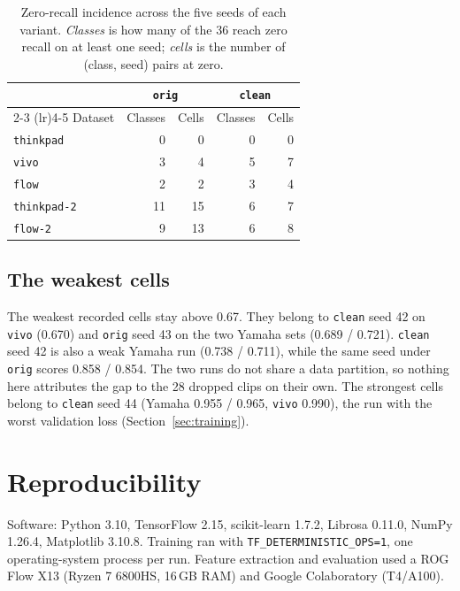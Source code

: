 \documentclass[pdflatex,sn-mathphys-num]{sn-jnl}
\begin{document}
\begin{table}[t]
\caption{Zero-recall incidence across the five seeds of each variant. \emph{Classes} is how many of the 36 reach zero recall on at least one seed; \emph{cells} is the number of (class, seed) pairs at zero.}\label{tab:esm-zero}
\setlength{\tabcolsep}{5pt}
\begin{tabular}{@{}lrrrr@{}}
\toprule
 & \multicolumn{2}{c}{\texttt{orig}} & \multicolumn{2}{c}{\texttt{clean}} \\
\cmidrule(lr){2-3} \cmidrule(lr){4-5}
Dataset & Classes & Cells & Classes & Cells \\
\midrule
\texttt{thinkpad} & 0 & 0 & 0 & 0 \\
\texttt{vivo} & 3 & 4 & 5 & 7 \\
\texttt{flow} & 2 & 2 & 3 & 4 \\
\texttt{thinkpad-2} & 11 & 15 & 6 & 7 \\
\texttt{flow-2} & 9 & 13 & 6 & 8 \\
\bottomrule
\end{tabular}
\end{table}

\subsection{The weakest cells}\label{sec:weakest}

The weakest recorded cells stay above 0.67. They belong to \texttt{clean} seed 42 on \texttt{vivo} (0.670) and \texttt{orig} seed 43 on the two Yamaha sets (0.689 / 0.721). \texttt{clean} seed 42 is also a weak Yamaha run (0.738 / 0.711), while the same seed under \texttt{orig} scores 0.858 / 0.854. The two runs do not share a data partition, so nothing here attributes the gap to the 28 dropped clips on their own. The strongest cells belong to \texttt{clean} seed 44 (Yamaha 0.955 / 0.965, \texttt{vivo} 0.990), the run with the worst validation loss (Section~\ref{sec:training}).

\section{Reproducibility}\label{sec:repro}

Software: Python 3.10, TensorFlow 2.15, scikit-learn 1.7.2, Librosa 0.11.0, NumPy 1.26.4, Matplotlib 3.10.8. Training ran with \texttt{TF\_DETERMINISTIC\_OPS=1}, one operating-system process per run. Feature extraction and evaluation used a ROG Flow X13 (Ryzen 7 6800HS, 16\,GB RAM) and Google Colaboratory (T4/A100).
\end{document}
